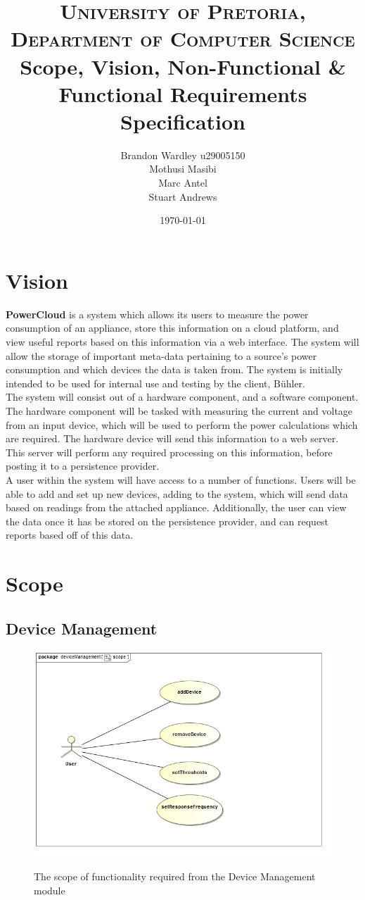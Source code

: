 \documentclass[paper=a4, fontsize=11pt]{scrartcl} %
\title {
	\normalfont \normalsize 
	\textsc{University of Pretoria, Department of Computer Science} \\ [25pt]
	\huge Scope, Vision, Non-Functional \& Functional Requirements Specification\\
}
\author {
	Brandon Wardley u29005150 \\
	Mothusi Masibi \\
	Marc Antel \\
	Stuart Andrews \\
}
\date{\normalsize\today} %
\begin{document}
	\maketitle %
	\newpage
	\section{Vision}
	\textbf{PowerCloud} is a system which allows its users to measure the power consumption of an appliance, store this information on a cloud platform, and view useful reports based on this information via a web interface. The system will allow the storage of important meta-data pertaining to a source's power consumption and which devices the data is taken from. The system is initially intended to be used for internal use and testing by the client, Bühler.\\
	
	The system will consist out of a hardware component, and a software component. The hardware component will be tasked with measuring the current and voltage from an input device, which will be used to perform the power calculations which are required. The hardware device will send this information to a web server. This server will perform any required processing on this information, before posting it to a persistence provider.\\
	
	A user within the system will have access to a number of functions. Users will be able to add and set up new devices, adding to the system, which will send data based on readings from the attached appliance. Additionally, the user can view the data once it has be stored on the persistence provider, and can request reports based off of this data.
	\newpage
	\section{Scope}
	\subsection{Device Management}
		\begin{figure}
			\includegraphics[width=\textwidth]{images/deviceManagementScope.jpg}  \\
			\caption{The scope of functionality required from the Device Management module}
		\end{figure}
		
\end{document}
